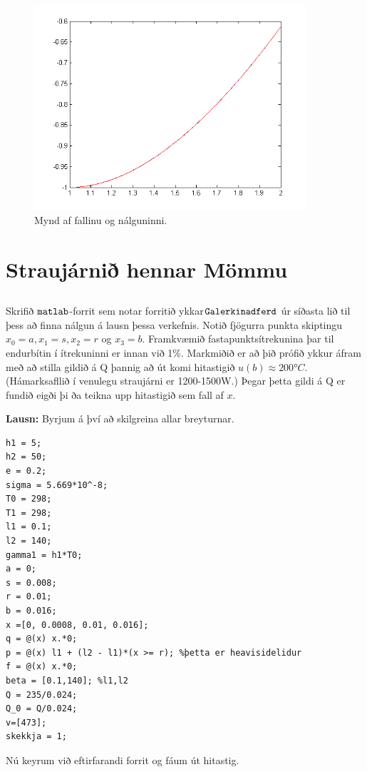 \documentclass[11pt,a4paper,titlepage]{article}
\begin{document}
   \begin{figure}[h!]
        \centering
        \includegraphics[width=0.9\textwidth]{nalgun2_4.png}
        \caption{Mynd af fallinu og nálguninni.}
        \label{fig:awesome_image2}
    \end{figure}
\section{Straujárnið hennar Mömmu}



\subsection{}

Skrifið $\verb|matlab|$-forrit sem notar forritið ykkar$ \verb|Galerkinadferd| $ úr síðasta lið til þess að finna nálgun á lausn þessa verkefnis. Notið fjögurra punkta skiptingu  $x_{0}=a, x_{1}=s, x_{2}=r$ og $x_{3}=b$.  Framkvæmið fastapunktsítrekunina þar til endurbítin í ítrekuninni er innan við 1\%.  Markmiðið er að þið prófið ykkur áfram með að stilla gildið á Q þannig að út komi hitastigið $u(b)\approx 200°C$. (Hámarksafllið í venulegu straujárni er 1200-1500W.) Þegar þetta gildi á Q er fundið eigði þi ða teikna upp hitastigið sem fall af $x$. 

\textbf{Lausn:}
Byrjum á því að skilgreina allar breyturnar.
\begin{verbatim}
h1 = 5;
h2 = 50;
e = 0.2;
sigma = 5.669*10^-8;
T0 = 298;
T1 = 298;
l1 = 0.1;
l2 = 140;
gamma1 = h1*T0;
a = 0;
s = 0.008;
r = 0.01;
b = 0.016;
x =[0, 0.0008, 0.01, 0.016];
q = @(x) x.*0;
p = @(x) l1 + (l2 - l1)*(x >= r); %þetta er heavisidelidur
f = @(x) x.*0;
beta = [0.1,140]; %l1,l2
Q = 235/0.024;
Q_0 = Q/0.024;
v=[473];
skekkja = 1;
\end{verbatim}
 Nú keyrum við eftirfarandi forrit og fáum út hitastig. 
 
\end{document}
